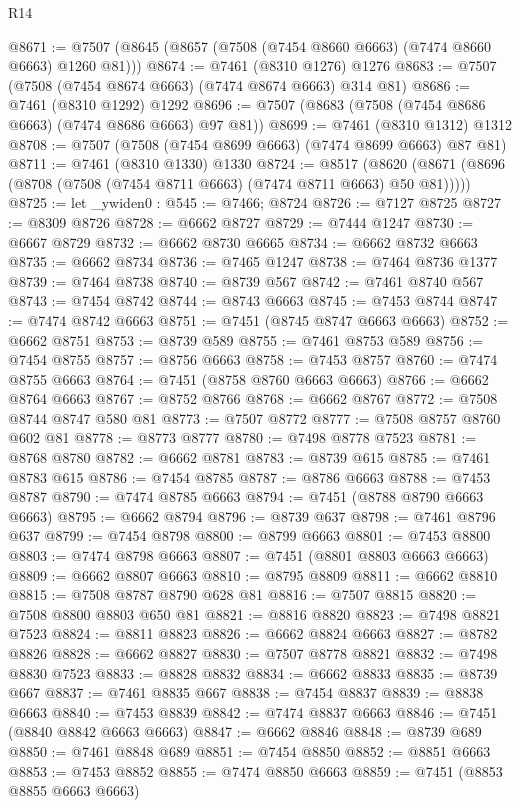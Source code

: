 \begin{lexlean}{R14}
\begin{coremodule}
@8671 := @7507 (@8645 (@8657 (@7508 (@7454 @8660 @6663) (@7474 @8660 @6663) @1260 @81)))
@8674 := @7461 (@8310 @1276) @1276
@8683 := @7507 (@7508 (@7454 @8674 @6663) (@7474 @8674 @6663) @314 @81)
@8686 := @7461 (@8310 @1292) @1292
@8696 := @7507 (@8683 (@7508 (@7454 @8686 @6663) (@7474 @8686 @6663) @97 @81))
@8699 := @7461 (@8310 @1312) @1312
@8708 := @7507 (@7508 (@7454 @8699 @6663) (@7474 @8699 @6663) @87 @81)
@8711 := @7461 (@8310 @1330) @1330
@8724 := @8517
    (@8620 (@8671 (@8696 (@8708 (@7508 (@7454 @8711 @6663) (@7474 @8711 @6663) @50 @81)))))
@8725 := let _ywiden0 : @545 := @7466; @8724
@8726 := @7127 @8725
@8727 := @8309 @8726
@8728 := @6662 @8727
@8729 := @7444 @1247
@8730 := @6667 @8729
@8732 := @6662 @8730 @6665
@8734 := @6662 @8732 @6663
@8735 := @6662 @8734
@8736 := @7465 @1247
@8738 := @7464 @8736 @1377
@8739 := @7464 @8738
@8740 := @8739 @567
@8742 := @7461 @8740 @567
@8743 := @7454 @8742
@8744 := @8743 @6663
@8745 := @7453 @8744
@8747 := @7474 @8742 @6663
@8751 := @7451 (@8745 @8747 @6663 @6663)
@8752 := @6662 @8751
@8753 := @8739 @589
@8755 := @7461 @8753 @589
@8756 := @7454 @8755
@8757 := @8756 @6663
@8758 := @7453 @8757
@8760 := @7474 @8755 @6663
@8764 := @7451 (@8758 @8760 @6663 @6663)
@8766 := @6662 @8764 @6663
@8767 := @8752 @8766
@8768 := @6662 @8767
@8772 := @7508 @8744 @8747 @580 @81
@8773 := @7507 @8772
@8777 := @7508 @8757 @8760 @602 @81
@8778 := @8773 @8777
@8780 := @7498 @8778 @7523
@8781 := @8768 @8780
@8782 := @6662 @8781
@8783 := @8739 @615
@8785 := @7461 @8783 @615
@8786 := @7454 @8785
@8787 := @8786 @6663
@8788 := @7453 @8787
@8790 := @7474 @8785 @6663
@8794 := @7451 (@8788 @8790 @6663 @6663)
@8795 := @6662 @8794
@8796 := @8739 @637
@8798 := @7461 @8796 @637
@8799 := @7454 @8798
@8800 := @8799 @6663
@8801 := @7453 @8800
@8803 := @7474 @8798 @6663
@8807 := @7451 (@8801 @8803 @6663 @6663)
@8809 := @6662 @8807 @6663
@8810 := @8795 @8809
@8811 := @6662 @8810
@8815 := @7508 @8787 @8790 @628 @81
@8816 := @7507 @8815
@8820 := @7508 @8800 @8803 @650 @81
@8821 := @8816 @8820
@8823 := @7498 @8821 @7523
@8824 := @8811 @8823
@8826 := @6662 @8824 @6663
@8827 := @8782 @8826
@8828 := @6662 @8827
@8830 := @7507 @8778 @8821
@8832 := @7498 @8830 @7523
@8833 := @8828 @8832
@8834 := @6662 @8833
@8835 := @8739 @667
@8837 := @7461 @8835 @667
@8838 := @7454 @8837
@8839 := @8838 @6663
@8840 := @7453 @8839
@8842 := @7474 @8837 @6663
@8846 := @7451 (@8840 @8842 @6663 @6663)
@8847 := @6662 @8846
@8848 := @8739 @689
@8850 := @7461 @8848 @689
@8851 := @7454 @8850
@8852 := @8851 @6663
@8853 := @7453 @8852
@8855 := @7474 @8850 @6663
@8859 := @7451 (@8853 @8855 @6663 @6663)

\end{coremodule}
\end{lexlean}
